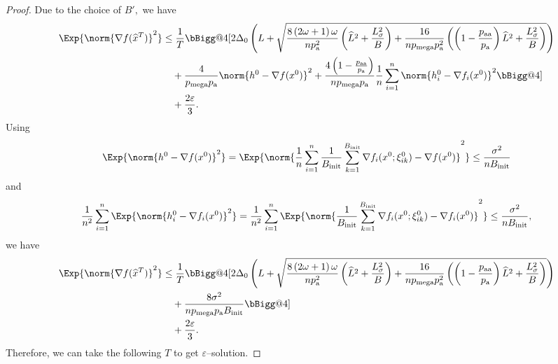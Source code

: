 \documentclass{article}
\makeatletter
\newcommand*{\probavailable}{\ensuremath{p_{\textnormal{a}}}}
\newcommand*{\probpairaa}{\ensuremath{p_{\textnormal{aa}}}}
\newcommand*{\probmega}{\ensuremath{p_{\text{mega}}}}
\newcommand{\vast}{\bBigg@{4}}
\makeatother
\begin{document}
\COROLLARYSYNCSTOCHASTIC*

\begin{proof}
  Due to the choice of $B',$ we have
  \begin{align*}
    \Exp{\norm{\nabla f(\widehat{x}^T)}^2} &\leq \frac{1}{T}\vast[2 \Delta_0\left(L + \sqrt{\frac{8 \left(2\omega + 1\right) \omega}{n \probavailable^2}\left(\widehat{L}^2 + \frac{L_{\sigma}^2}{B}\right) + \frac{16}{n \probmega \probavailable^2} \left(\left(1 - \frac{\probpairaa}{\probavailable}\right) \widehat{L}^2 + \frac{L_{\sigma}^2}{B}\right)}\right) \\
    &\quad + \frac{4}{\probmega \probavailable} \norm{h^{0} - \nabla f(x^{0})}^2 + \frac{4 \left(1 - \frac{\probpairaa}{\probavailable}\right)}{n \probmega \probavailable}\frac{1}{n}\sum_{i=1}^n\norm{h^{0}_i - \nabla f_i(x^{0})}^2 \vast] \\
    &\quad + \frac{2 \varepsilon}{3}.
  \end{align*}
  Using 
  \begin{align*}
    \Exp{\norm{h^{0} - \nabla f(x^{0})}^2} = \Exp{\norm{\frac{1}{n} \sum_{i=1}^n \frac{1}{B_{\textnormal{init}}} \sum_{k = 1}^{B_{\textnormal{init}}} \nabla f_i(x^0; \xi^0_{ik}) - \nabla f(x^{0})}^2} \leq \frac{\sigma^2}{n B_{\textnormal{init}}}
  \end{align*}
  and 
  \begin{align*}
    \frac{1}{n^2} \sum_{i=1}^n\Exp{\norm{h^{0}_i - \nabla f_i(x^{0})}^2} = \frac{1}{n^2} \sum_{i=1}^n \Exp{\norm{\frac{1}{B_{\textnormal{init}}} \sum_{k = 1}^{B_{\textnormal{init}}} \nabla f_i(x^0; \xi^0_{ik}) - \nabla f_i(x^{0})}^2} \leq \frac{\sigma^2}{n B_{\textnormal{init}}},
  \end{align*}
  we have
  \begin{align*}
    \Exp{\norm{\nabla f(\widehat{x}^T)}^2} &\leq \frac{1}{T}\vast[2 \Delta_0\left(L + \sqrt{\frac{8 \left(2\omega + 1\right) \omega}{n \probavailable^2}\left(\widehat{L}^2 + \frac{L_{\sigma}^2}{B}\right) + \frac{16}{n \probmega \probavailable^2} \left(\left(1 - \frac{\probpairaa}{\probavailable}\right) \widehat{L}^2 + \frac{L_{\sigma}^2}{B}\right)}\right) \\
    &\quad + \frac{8 \sigma^2}{n \probmega \probavailable B_{\textnormal{init}}} \vast] \\
    &\quad + \frac{2 \varepsilon}{3}.
  \end{align*}
  Therefore, we can take the following $T$ to get $\varepsilon$--solution.

\end{proof}
\end{document}
